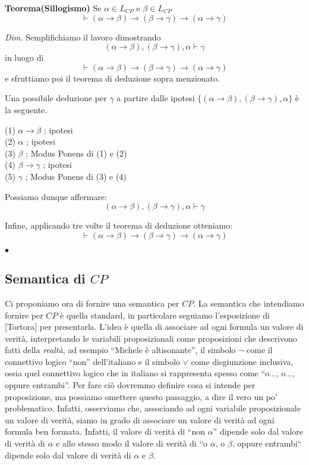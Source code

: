 \documentclass[a4paper, titlepage, 12pt]{report}
\begin{document}
\begin{flushleft}
\textbf{Teorema(Sillogismo)}
Se $\alpha \in L_{CP}$ e $\beta \in L_{CP}$
$$\vdash (\alpha \rightarrow \beta) \rightarrow
        (\beta \rightarrow \gamma) \rightarrow (\alpha \rightarrow \gamma)$$

\textit{Dim.}
Semplifichiamo il lavoro dimostrando
$$(\alpha \rightarrow \beta),(\beta \rightarrow \gamma),\alpha \vdash \gamma$$
in luogo di
$$\vdash (\alpha \rightarrow \beta) \rightarrow
        (\beta \rightarrow \gamma) \rightarrow (\alpha \rightarrow \gamma)$$
e sfruttiamo poi il teorema di deduzione sopra menzionato.

Una possibile deduzione per $\gamma$ a partire dalle ipotesi
$\{(\alpha \rightarrow \beta),(\beta \rightarrow \gamma),\alpha\}$ è la seguente.

(1) $\alpha \rightarrow \beta$ ; ipotesi \\
(2) $\alpha$ ; ipotesi \\
(3) $\beta$ ; Modus Ponens di (1) e (2) \\
(4) $\beta \rightarrow \gamma$ ; ipotesi \\
(5) $\gamma$ ; Modus Ponens di (3) e (4)

Possiamo dunque affermare:
$$(\alpha \rightarrow \beta),(\beta \rightarrow \gamma),\alpha \vdash \gamma$$

Infine, applicando tre volte il teorema di deduzione otteniamo:
$$\vdash (\alpha \rightarrow \beta) \rightarrow (\beta \rightarrow \gamma) \rightarrow (\alpha \rightarrow \gamma)$$

\begin{flushright}
$\bullet$
\end{flushright}
\end{flushleft}

\subsection{Semantica di $CP$}
Ci proponiamo ora di fornire una semantica per $CP$.
La semantica che intendiamo fornire per $CP$ è quella standard, in particolare
seguiamo l'esposizione di [Tortora] per presentarla.
L'idea è quella di associare ad ogni formula
un valore di verità, interpretando le variabili proposizionali come proposizioni
che descrivono fatti della \textit{realtà}, ad esempio ``Michele è altisonante'',
il simbolo $\neg$ come il connettivo logico ``non'' dell'italiano
e il simbolo $\lor$ come disgiunzione inclusiva, ossia quel connettivo
logico che in italiano si rappresenta spesso come ``o..., o..., oppure entrambi''.
Per fare ciò dovremmo definire cosa si intende per proposizione,
ma possiamo omettere questo passaggio, a dire il vero un po' problematico.
Infatti, osserviamo che, associando ad ogni variabile proposizionale un valore di verità,
siamo in grado di associare un valore di verità ad ogni formula ben formata.
Infatti, il valore di verità di ``non $\alpha$'' dipende solo dal valore di verità
di $\alpha$ e allo stesso modo il valore di verità di
``o $\alpha$, o $\beta$, oppure entrambi``
dipende solo dal valore di verità di $\alpha$ e $\beta$.
\end{document}
